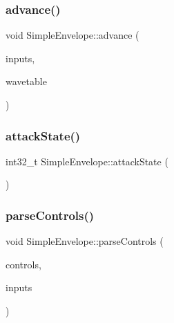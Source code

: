 \subsubsection{\texorpdfstring{advance()}{advance()}}
{\footnotesize\ttfamily void Simple\+Envelope\+::advance (\begin{DoxyParamCaption}\item[{\mbox{\hyperlink{class_via_input_streams}{Via\+Input\+Streams}} $\ast$}]{inputs,  }\item[{uint32\+\_\+t $\ast$}]{wavetable }\end{DoxyParamCaption})}

\mbox{\label{class_simple_envelope_ab9c33fdb73ee3dce2983e33f6ac44af6}} 
\subsubsection{\texorpdfstring{attack\+State()}{attackState()}}
{\footnotesize\ttfamily int32\+\_\+t Simple\+Envelope\+::attack\+State (\begin{DoxyParamCaption}\item[{void}]{ }\end{DoxyParamCaption})}

\mbox{\label{class_simple_envelope_a0fdf4e82a5eef737eab97e47ba92eef5}} 
\subsubsection{\texorpdfstring{parse\+Controls()}{parseControls()}}
{\footnotesize\ttfamily void Simple\+Envelope\+::parse\+Controls (\begin{DoxyParamCaption}\item[{\mbox{\hyperlink{class_via_controls}{Via\+Controls}} $\ast$}]{controls,  }\item[{\mbox{\hyperlink{class_via_input_streams}{Via\+Input\+Streams}} $\ast$}]{inputs }\end{DoxyParamCaption})}

\mbox{\label{class_simple_envelope_a80ddc519be4aaa0f72a46c5b0a3b2fab}} 
